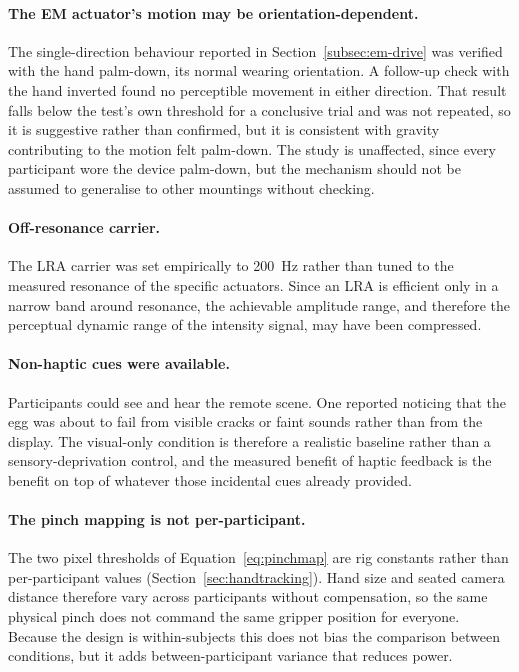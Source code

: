 \documentclass[12pt, a4paper, twoside, openright]{report}
\begin{document}
\paragraph{The EM actuator's motion may be orientation-dependent.} The
single-direction behaviour reported in Section~\ref{subsec:em-drive} was
verified with the hand palm-down, its normal wearing orientation. A follow-up
check with the hand inverted found no perceptible movement in either
direction. That result falls below the test's own threshold for a conclusive
trial and was not repeated, so it is suggestive rather than confirmed, but it
is consistent with gravity contributing to the motion felt palm-down. The
study is unaffected, since every participant wore the device palm-down, but
the mechanism should not be assumed to generalise to other mountings without
checking.

\paragraph{Off-resonance carrier.} The LRA carrier was set empirically to
\SI{200}{\hertz} rather than tuned to the measured resonance of the specific
actuators. Since an LRA is efficient only in a narrow band around resonance,
the achievable amplitude range, and therefore the perceptual dynamic range of
the intensity signal, may have been compressed.

\paragraph{Non-haptic cues were available.} Participants could see and hear the
remote scene. One reported noticing that the egg was about to fail from visible
cracks or faint sounds rather than from the display. The visual-only condition
is therefore a realistic baseline rather than a sensory-deprivation control,
and the measured benefit of haptic feedback is the benefit on top of whatever
those incidental cues already provided.

\paragraph{The pinch mapping is not per-participant.} The two pixel thresholds
of Equation~\eqref{eq:pinchmap} are rig constants rather than per-participant
values (Section~\ref{sec:handtracking}). Hand size and seated camera distance
therefore vary across participants without compensation, so the same physical
pinch does not command the same gripper position for everyone. Because the
design is within-subjects this does not bias the comparison between conditions,
but it adds between-participant variance that reduces power.
\end{document}
